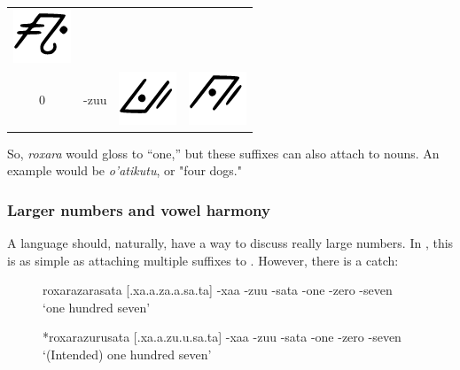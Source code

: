 \begin{table}[H]
\begin{tabular}{c|ccc}
						\includegraphics[scale=0.25]{././img/9U.png} \\
					0 & -zu\R u &
						\includegraphics[scale=0.25]{././img/0A.png} &
						\includegraphics[scale=0.25]{././img/0U.png} \\ \hline
				\end{tabular}
			\end{table}

		So, \emph{roxara} would gloss to ``one,'' but these suffixes can also attach to nouns. An example would be \emph{o'atikutu}, or "four dogs."

		\subsubsection{Larger numbers and vowel harmony}
		\label{number_harmony}
			A language should, naturally, have a way to discuss really large numbers. In \kurango, this is as simple as attaching multiple suffixes to \emph{\R\OO}. However, there is a catch:

				\begin{figure}[H]
				\label{interlin_num_harm}
					\begin{example}
					\label{num_a_harm}	
						roxarazarasata [\R\OO.\stress xa.\R a.za.\R a.sa.ta]
						\gll {\R\OO} -xa\R a -zu\R u -sata
						 -one -zero -seven
						\glt `one hundred seven'
						\glend
					\end{example}

					\begin{example}
					\label{num_u_harm}
						*roxarazurusata [\R\OO.\stress xa.\R a.zu.\R u.sa.ta]
						\gll {\R\OO} -xa\R a -zu\R u -sata
						 -one -zero -seven
						\glt `(Intended) one hundred seven'
						\glend
					\end{example}
				\end{figure}

